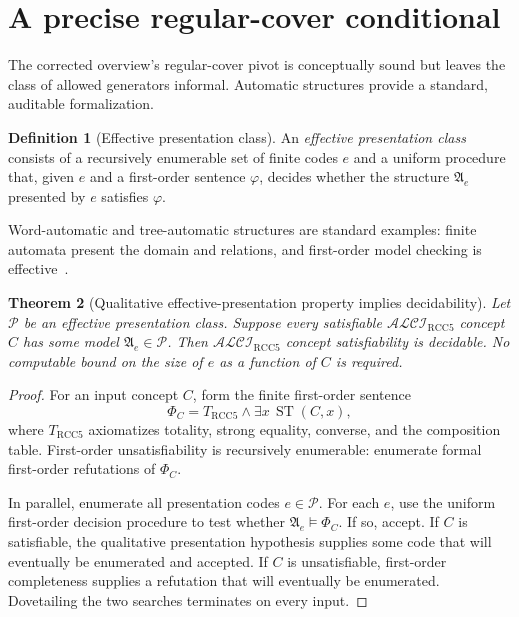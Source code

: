 \documentclass[11pt]{article}
\newtheorem{theorem}{Theorem}[section]
\theoremstyle{definition}
\newtheorem{definition}[theorem]{Definition}
\theoremstyle{remark}
\newcommand{\RCC}{\mathrm{RCC5}}
\newcommand{\ALCIRCC}{\mathcal{ALCI}_{\mathrm{RCC5}}}
\newcommand{\ST}{\operatorname{ST}}
\newcommand{\modelsC}{\models}
\begin{document}
\section{A precise regular-cover conditional}

The corrected overview's regular-cover pivot is conceptually sound but leaves the class of allowed generators informal.  Automatic structures provide a standard, auditable formalization.

\begin{definition}[Effective presentation class]
An \emph{effective presentation class} consists of a recursively enumerable set of finite codes $e$ and a uniform procedure that, given $e$ and a first-order sentence $\varphi$, decides whether the structure $\mathfrak A_e$ presented by $e$ satisfies $\varphi$.
\end{definition}

Word-automatic and tree-automatic structures are standard examples: finite automata present the domain and relations, and first-order model checking is effective~\cite{KhoussainovNerode,BlumensathGraedel}.

\begin{theorem}[Qualitative effective-presentation property implies decidability]\label{thm:effective-presentations}
Let $\mathcal P$ be an effective presentation class.  Suppose every satisfiable $\ALCIRCC$ concept $C$ has some model $\mathfrak A_e\in\mathcal P$.  Then $\ALCIRCC$ concept satisfiability is decidable.  No computable bound on the size of $e$ as a function of $C$ is required.
\end{theorem}

\begin{proof}
For an input concept $C$, form the finite first-order sentence
\[
 \Phi_C=T_{\RCC}\wedge\exists x\,\ST(C,x),
\]
where $T_{\RCC}$ axiomatizes totality, strong equality, converse, and the composition table.  First-order unsatisfiability is recursively enumerable: enumerate formal first-order refutations of $\Phi_C$.

In parallel, enumerate all presentation codes $e\in\mathcal P$.  For each $e$, use the uniform first-order decision procedure to test whether $\mathfrak A_e\modelsC\Phi_C$.  If so, accept.  If $C$ is satisfiable, the qualitative presentation hypothesis supplies some code that will eventually be enumerated and accepted.  If $C$ is unsatisfiable, first-order completeness supplies a refutation that will eventually be enumerated.  Dovetailing the two searches terminates on every input.
\end{proof}
\end{document}
